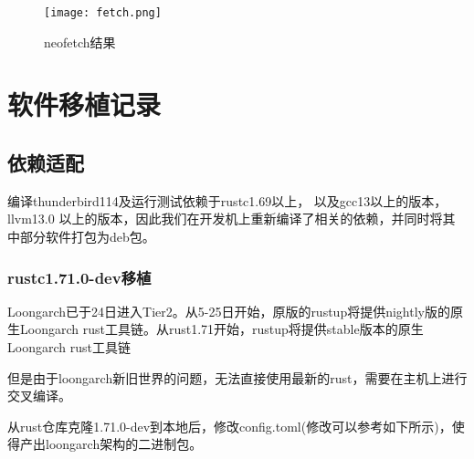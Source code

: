 \documentclass[lang=cn,a4paper,newtx]{elegantpaper}
\begin{document}
\begin{figure}[!htb]
    \centering
    \texttt{[image: fetch.png]}
    \caption{neofetch结果}
    \label{neofetch}
\end{figure}


\section{软件移植记录}
\subsection{依赖适配}

编译thunderbird114及运行测试依赖于rustc1.69以上， 以及gcc13以上的版本，llvm13.0 以上的版本，因此我们在开发机上重新编译了相关的依赖，并同时将其中部分软件打包为deb包。

\subsubsection{rustc1.71.0-dev移植}
Loongarch已于24日进入Tier2。从5-25日开始，原版的rustup将提供nightly版的原生Loongarch rust工具链。从rust1.71开始，rustup将提供stable版本的原生Loongarch rust工具链

但是由于loongarch新旧世界的问题，无法直接使用最新的rust，需要在主机上进行交叉编译。

从rust仓库克隆1.71.0-dev到本地后，修改config.toml(修改可以参考如下所示)，使得产出loongarch架构的二进制包。
\end{document}
